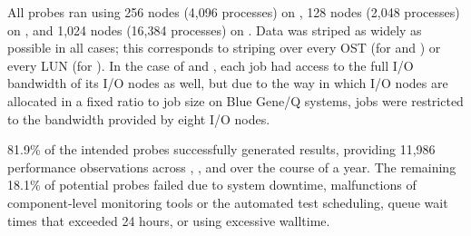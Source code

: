 All probes ran using 256 nodes (4,096 processes) on \cori, 128 nodes (2,048 processes) on \edison, and 1,024 nodes (16,384 processes) on \mira.
Data was striped as widely as possible in all cases; this corresponds to
striping over every OST (for \cori and \edison) or every LUN (for \mira).
In the case of \cori and \edison, each job had access to the full I/O bandwidth of its I/O nodes as well, but due to the way in which I/O nodes are allocated in a fixed ratio to job size on Blue Gene/Q systems, \mira jobs were restricted to the bandwidth provided by eight I/O nodes.

81.9\% of the intended probes successfully generated results, providing 
11,986 performance observations across \mira, \cori, and \edison over the
course of a year.
The remaining 18.1\% of potential probes failed due to system downtime, malfunctions of component-level monitoring tools or the automated test scheduling, queue wait times that exceeded 24 hours, or using excessive walltime.

